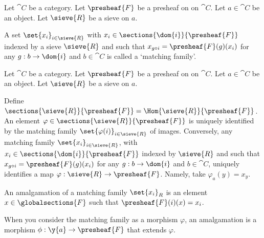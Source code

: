 \begin{definition}
Let $\cat{C}$ be a category.
Let $\presheaf{F}$ be a presheaf on on $\cat{C}$.
Let $a \in \cat{C}$ be an object.
Let $\sieve{R}$ be a sieve on $a$.


A set $\set{x_i}_{i \in \sieve{R}}$ 
with $x_i \in \sections{\dom{i}}{\presheaf{F}}$ 
indexed by a sieve $\sieve{R}$
and such that $x_{g \circ i} = \presheaf{F}(g)(x_i)$ 
for any $g:b \rightarrow \dom{i}$ 
and $b \in \cat{C}$ is called a `matching family'.
\end{definition}

\begin{definition}
Let $\cat{C}$ be a category.
Let $\presheaf{F}$ be a presheaf on on $\cat{C}$.
Let $a \in \cat{C}$ be an object.
Let $\sieve{R}$ be a sieve on $a$.

Define $\sections{\sieve{R}}{\presheaf{F}} = \Hom{\sieve{R}}{\presheaf{F}}$.
An element $\varphi \in \sections{\sieve{R}}{\presheaf{F}}$ is uniquely identified 
by the matching family $\set{\varphi(i)}_{i\in\sieve{R}}$ of images. 
Conversely, any matching family $\set{x_i}_{i \in \sieve{R}}$, 
with $x_i \in \sections{\dom{i}}{\presheaf{F}}$ indexed by $\sieve{R}$
and such that $x_{g \circ i} = \presheaf{F}(g)(x_i)$ 
for any $g:b \rightarrow \dom{i}$ and $b \in \cat{C}$, uniquely identifies 
a map $\varphi: \sieve{R} \rightarrow \presheaf{F}$.
Namely, take $\varphi_a(y) = x_y$.
\end{definition}

\begin{definition}[Amalgamation]
An amalgamation of a matching family $\set{x_i}_R$ 
is an element $x\in \globalsections{F}$
such that $\presheaf{F}(i)(x) = x_i$.

When you consider the matching family as a morphism $\varphi$,
an amalgamation is a morphism $\phi: \y{a} \rightarrow \presheaf{F}$
that extends $\varphi$.
\end{definition}